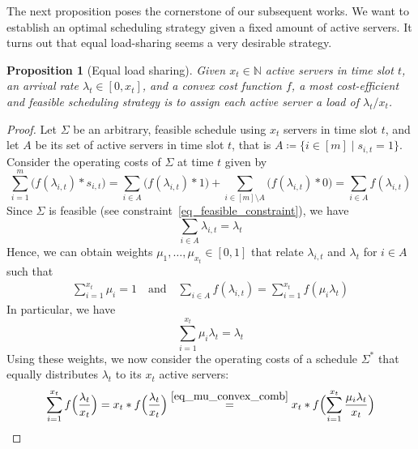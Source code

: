 \documentclass[hidelinks]{article}
\theoremstyle{plain}
\newtheorem{prop}[thm]{Proposition}
\theoremstyle{definition}
\theoremstyle{rem}
\begin{document}
The next proposition poses the cornerstone of our subsequent works. We want to establish an optimal scheduling strategy given a fixed amount of active servers. It turns out that equal load-sharing seems a very desirable strategy.
\begin{prop}[Equal load sharing]\label{prop_equ_load_sharing}
Given $x_t\in\mathbb{N}$ active servers in time slot $t$, an arrival rate $\lambda_t\in[0,x_t]$, and a convex cost function $f$, a most cost-efficient and feasible scheduling strategy is to assign each active server a load of $\lambda_t/x_t$.
\end{prop}
\begin{proof}
Let $\Sigma$ be an arbitrary, feasible schedule using $x_t$ servers in time slot $t$, and let $A$ be its set of active servers in time slot $t$, that is $A\coloneqq\{i\in[m]\mid s_{i,t}=1\}$.
Consider the operating costs of $\Sigma$ at time $t$ given by
\begin{equation*}
	\sum\limits_{i=1}^{m}\bigl(f(\lambda_{i,t})*s_{i,t}\bigr)=\sum\limits_{i\in A}\bigl(f(\lambda_{i,t})*1\bigr)+\sum\limits_{i\in [m]\setminus A}\bigl(f(\lambda_{i,t})*0\bigr)=\sum\limits_{i\in A}f(\lambda_{i,t})
\end{equation*}
Since $\Sigma$ is feasible (see constraint~\eqref{eq_feasible_constraint}), we have 
\begin{equation*}
	\sum\limits_{i\in A}\lambda_{i,t}=\lambda_t
\end{equation*}
Hence, we can obtain weights $\mu_1,\ldots,\mu_{x_t}\in[0,1]$ that relate $\lambda_{i,t}$ and $\lambda_t$ for $i\in A$ such that
\begin{align}
	\sum\limits_{i=1}^{x_t}\mu_i=1\quad\text{and}\quad \sum\limits_{i\in A}f(\lambda_{i,t})=\sum\limits_{i=1}^{x_t}f(\mu_i\lambda_t)\label{eq_mu_lambda_costs}
\end{align}
In particular, we have 
\begin{equation}
	\sum_{i=1}^{x_t}\mu_i\lambda_t=\lambda_t\label{eq_mu_convex_comb}
\end{equation}
Using these weights, we now consider the operating costs of a schedule $\Sigma^*$ that equally distributes $\lambda_t$ to its $x_t$ active servers:
\begin{align*}
	\sum\limits_{i=1}^{x_t}f\Bigl(\frac{\lambda_t}{x_t}\Bigr)=x_t*f\Bigl(\frac{\lambda_t}{x_t}\Bigr)\stackrel{\eqref{eq_mu_convex_comb}}{=}x_t*f\Bigl(\sum\limits_{i=1}^{x_t}{\frac{\mu_i\lambda_t}{x_t}}\Bigr)
\end{align*}

\end{proof}
\end{document}
